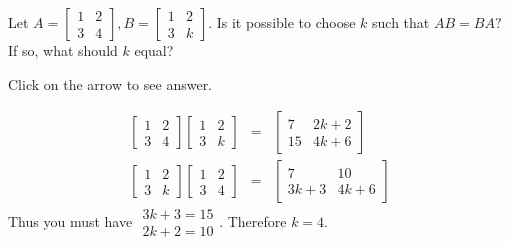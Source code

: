 \documentclass{ximera}
\begin{document}
\begin{problem}\label{prb:4.14} Let $A=\left[
\begin{array}{rr}
1 & 2 \\
3 & 4
\end{array}
\right] ,B=\left[
\begin{array}{rr}
1 & 2 \\
3 & k
\end{array}
\right] .$ Is it possible to choose $k$ such that $AB=BA?$ If so, what
should $k$ equal?

Click on the arrow to see answer.
\begin{expandable}
\begin{eqnarray*}
\left[
\begin{array}{cc}
1 & 2 \\
3 & 4
\end{array}
\right] \left[
\begin{array}{cc}
1 & 2 \\
3 & k
\end{array}
\right] &=& \left[
\begin{array}{cc}
7 & 2k+2 \\
15 & 4k+6
\end{array}
\right] \\
 \left[
\begin{array}{cc}
1 & 2 \\
3 & k
\end{array}
\right] \left[
\begin{array}{cc}
1 & 2 \\
3 & 4
\end{array}
\right] &=& \left[
\begin{array}{cc}
7 & 10 \\
3k+3 & 4k+6
\end{array}
\right]
\end{eqnarray*}
 Thus you must have $
\begin{array}{c}
3k+3=15 \\
2k+2=10
\end{array}
$.  Therefore $k=4$.
\end{expandable}
\end{problem}
\end{document}
